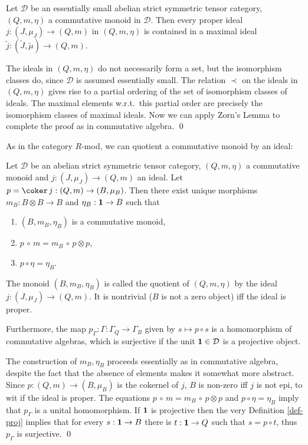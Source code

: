 \documentclass[11pt]{article}
\theoremstyle{definition}
\theoremstyle{definition}
\theoremstyle{remark}
\def\2#1{{\mathcal #1}}
\def\1#1{{\bf #1}}
\newcommand{\mcirc}{\,\circ\,}
\newcommand{\rarr}{\rightarrow}
\newcounter{bean}
\begin{document}
\blemma \label{l-maxid}
Let $\2D$ be an essentially small abelian strict symmetric tensor category, $(Q,m,\eta)$ a
commutative monoid in $\2D$. Then every proper ideal $j:(J,\mu_J)\rarr(Q,m)$ in $(Q,m,\eta)$ is
contained in a maximal ideal $\widetilde{j}:(\widetilde{J},\widetilde{\mu})\rarr(Q,m)$.
\elemma

\prf The ideals in $(Q,m,\eta)$ do not necessarily form a set, but the isomorphism classes do, since
$\2D$ is assumed essentially small. The relation $\prec$ on the ideals in $(Q,m,\eta)$ gives rise to
a partial ordering of the set of isomorphism classes of ideals. The maximal elements w.r.t.\ this
partial order are precisely the isomorphism classes of maximal ideals. Now we can apply Zorn's Lemma
to complete the proof as in commutative algebra.
\qed

As in the category $R$-mod, we can quotient a commutative monoid by an ideal:

\blemma \label{l-quot} 
Let $\2D$ be an abelian strict symmetric tensor category, $(Q,m,\eta)$ a commutative monoid and
$j:(J,\mu_J)\rarr(Q,m)$ an ideal. Let $p=\coker\,j:(Q,m)\rarr(B,\mu_B)$. Then there exist unique
morphisms $m_B: B\otimes B\rarr B$ and $\eta_B: \11\rarr B$ such that  
\begin{enumerate}
\item $(B,m_B,\eta_B)$ is a commutative monoid,
\item $p\mcirc m=m_B\mcirc p\otimes p$,
\item $p\circ\eta=\eta_B$. 
\end{enumerate}
The monoid $(B,m_B,\eta_B)$ is called the quotient of $(Q,m,\eta)$ by the ideal
$j:(J,\mu_J)\rarr(Q,m)$. It is nontrivial ($B$ is not a zero object) iff the ideal is proper.

Furthermore, the map $p_\Gamma:\Gamma:\Gamma_Q\rarr\Gamma_B$ given by $s\mapsto p\circ s$ is a
homomorphism of commutative algebras, which is surjective if the unit $\11\in\2D$ is a projective
object.
\elemma

\prf The construction of $m_B,\eta_B$ proceeds essentially as in commutative algebra, despite the
fact that the absence of elements makes it somewhat more abstract. Since $p:(Q,m)\rarr(B,\mu_B)$ is
the cokernel of $j$, $B$ is non-zero iff $j$ is not epi, to wit if the ideal is proper. The
equations $p\mcirc m=m_B\mcirc p\otimes p$ and $p\circ\eta=\eta_B$ imply that $p_\Gamma$ is a unital
homomorphism. 
If $\11$ is projective then the very Definition \ref{def-proj} implies that for every $s:\11\rarr B$
there is $t:\11\rarr Q$ such that $s=p\circ t$, thus $p_\Gamma$ is surjective.
\qed
\end{document}
